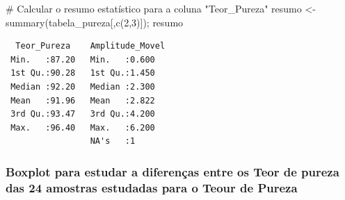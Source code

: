 \documentclass[
  letterpaper,
  DIV=11,
  numbers=noendperiod]{scrartcl}
\newenvironment{Shaded}{\begin{snugshade}}{\end{snugshade}}
\newcommand{\CommentTok}[1]{\textcolor[rgb]{0.37,0.37,0.37}{#1}}
\newcommand{\DecValTok}[1]{\textcolor[rgb]{0.68,0.00,0.00}{#1}}
\newcommand{\FunctionTok}[1]{\textcolor[rgb]{0.28,0.35,0.67}{#1}}
\newcommand{\NormalTok}[1]{\textcolor[rgb]{0.00,0.23,0.31}{#1}}
\newcommand{\OtherTok}[1]{\textcolor[rgb]{0.00,0.23,0.31}{#1}}
\begin{document}
\begin{Shaded}
\begin{Highlighting}[]
\CommentTok{\# Calcular o resumo estatístico para a coluna "Teor\_Pureza"}
\NormalTok{resumo }\OtherTok{\textless{}{-}} \FunctionTok{summary}\NormalTok{(tabela\_pureza[,}\FunctionTok{c}\NormalTok{(}\DecValTok{2}\NormalTok{,}\DecValTok{3}\NormalTok{)]); resumo}
\end{Highlighting}
\end{Shaded}

\begin{verbatim}
  Teor_Pureza    Amplitude_Movel
 Min.   :87.20   Min.   :0.600  
 1st Qu.:90.28   1st Qu.:1.450  
 Median :92.20   Median :2.300  
 Mean   :91.96   Mean   :2.822  
 3rd Qu.:93.47   3rd Qu.:4.200  
 Max.   :96.40   Max.   :6.200  
                 NA's   :1      
\end{verbatim}

\subsubsection{Boxplot para estudar a diferenças entre os Teor de pureza
das 24 amostras estudadas para o Teour de
Pureza}\label{boxplot-para-estudar-a-diferenuxe7as-entre-os-teor-de-pureza-das-24-amostras-estudadas-para-o-teour-de-pureza}
\end{document}
